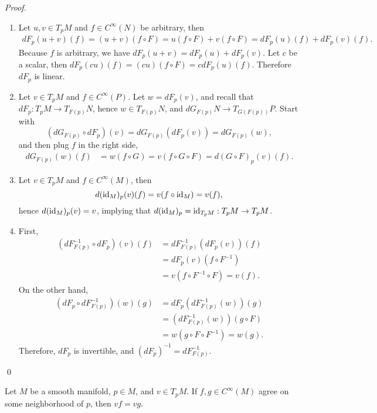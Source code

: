 \begin{proof}
    \begin{enumerate}
    \item Let $u,v \in T_pM$ and $f \in C^\infty(N)$ be arbitrary, then 
    \begin{align*}
        dF_p(u+v)(f) = (u+v)(f \circ F) = u(f \circ F) + v(f \circ F)
        = dF_p(u)(f) + dF_p(v)(f).
    \end{align*}
    Because $f$ is arbitrary, we have $dF_p(u+v) = dF_p(u) + dF_p(v)$. Let $c$ be a scalar, then $dF_p(cu)(f) = (cu)(f \circ F) = c dF_p(u)(f)$. Therefore $dF_p$ is linear. 
    \item Let $v \in T_pM$ and $f \in C^\infty(P)$. Let $w = dF_p(v)$, and recall that 
    $dF_p:T_pM \to T_{F(p)}N$, hence $w \in T_{F(p)}N$, and 
    $dG_{F(p)}N \to T_{G(F(p))}P$. Start with
    $$(dG_{F(p)} \circ dF_p)(v) = dG_{F(p)}(dF_p(v))=dG_{F(p)}(w), $$ and then plug $f$ in the right side, 
    \begin{align*}
    dG_{F(p)}(w)(f) &= w(f \circ G) = v(f \circ G \circ F)
    = d(G \circ F)_p(v)(f). 
    \end{align*}


    
    \item Let $v \in T_pM$ and $f \in C^\infty(M)$, then 
    $$d(\mathrm{id}_M)_p(v)(f) = v(f \circ \mathrm{id}_M) = v(f), $$
    hence $d(\mathrm{id}_M)_p(v) = v$, implying that $d(\mathrm{id}_M)_p = \mathrm{id}_{T_pM}: T_pM \to T_pM$.
    \item First, 
    \begin{align*}
    (dF^{-1}_{F(p)} \circ dF_p)(v)(f) 
    &= dF^{-1}_{F(p)}(dF_p(v))(f) \\
    &= dF_p(v) (f \circ F^{-1}) \\
    &= v(f \circ F^{-1} \circ F) = v(f).  
    \end{align*}
    On the other hand, 
    \begin{align*}
    (dF_p \circ dF^{-1}_{F(p)})(w)(g) 
    &= dF_p(dF^{-1}_{F(p)}(w))(g) \\
    &= (dF^{-1}_{F(p)}(w))(g \circ F) \\
    &= w(g \circ F \circ F^{-1}) = w(g). 
    \end{align*}
    Therefore, $dF_p$ is invertible, and $(dF_p)^{-1}=dF^{-1}_{F(p)}$. 
    \end{enumerate} \qed 
\end{proof}
\begin{proposition}\label{Lee3.8}
    Let $M$ be a smooth manifold, $p \in M$, and $v \in T_pM$. If $f,g \in C^\infty(M)$ agree on some neighborhood of $p$, then $vf = vg$.
\end{proposition}

